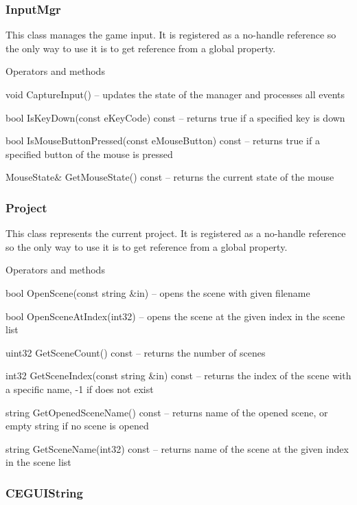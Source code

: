 \subsubsection{InputMgr}

This class manages the game input. It is registered as a no-handle reference so the only way to use it is to get reference from a global property.

\begin{titled-itemize}{Operators and methods}
  \item void CaptureInput() -- updates the state of the manager and processes all events
  \item bool IsKeyDown(const eKeyCode) const -- returns true if a specified key is down
  \item bool IsMouseButtonPressed(const eMouseButton) const -- returns true if a specified button of the mouse is pressed
  \item MouseState\& GetMouseState() const -- returns the current state of the mouse
\end{titled-itemize}

\subsubsection{Project}

This class represents the current project. It is registered as a no-handle reference so the only way to use it is to get reference from a global property.

\begin{titled-itemize}{Operators and methods}
  \item bool OpenScene(const string \&in) -- opens the scene with given filename
  \item bool OpenSceneAtIndex(int32) -- opens the scene at the given index in the scene list
  \item uint32 GetSceneCount() const -- returns the number of scenes
  \item int32 GetSceneIndex(const string \&in) const -- returns the index of the scene with a specific name, -1 if does not exist
  \item string GetOpenedSceneName() const -- returns name of the opened scene, or empty string if no scene is opened
  \item string GetSceneName(int32) const -- returns name of the scene at the given index in the scene list
\end{titled-itemize}

\subsubsection{CEGUIString}

